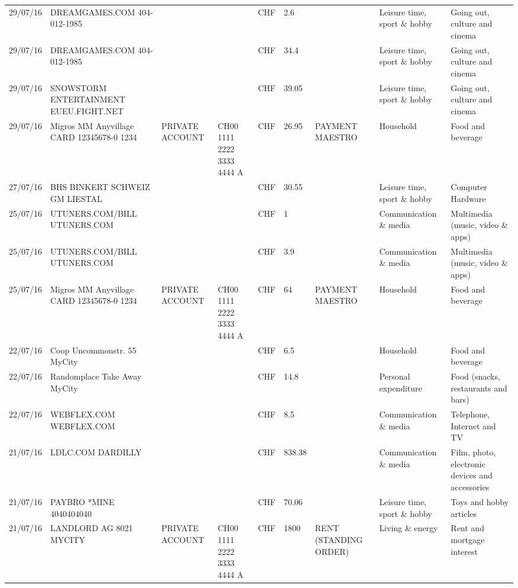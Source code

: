 \begin{landscape}
\begin{adjustwidth}{-2cm}{-2cm}
\begin{tiny}
\begin{longtable}{lp{4cm}llllp{3cm}ll}
		29/07/16 & DREAMGAMES.COM           404-012-1985 &       &       & CHF   & 2.6   &       & Leisure time, sport \& hobby & Going out, culture and cinema \\
		29/07/16 & DREAMGAMES.COM           404-012-1985 &       &       & CHF   & 34.4  &       & Leisure time, sport \& hobby & Going out, culture and cinema \\
		29/07/16 & SNOWSTORM ENTERTAINMENT EUEU.FIGHT.NET &       &       & CHF   & 39.05 &       & Leisure time, sport \& hobby & Going out, culture and cinema \\
		29/07/16 & Migros MM Anyvillage CARD 12345678-0 1234 & PRIVATE ACCOUNT & CH00 1111 2222 3333 4444 A & CHF   & 26.95 & PAYMENT MAESTRO & Household & Food and beverage \\
		27/07/16 & BHS BINKERT SCHWEIZ GM   LIESTAL &       &       & CHF   & 30.55 &       & Leisure time, sport \& hobby & Computer Hardware \\
		25/07/16 & UTUNERS.COM/BILL          UTUNERS.COM &       &       & CHF   & 1     &       & Communication \& media & Multimedia (music, video \& apps) \\
		25/07/16 & UTUNERS.COM/BILL          UTUNERS.COM &       &       & CHF   & 3.9   &       & Communication \& media & Multimedia (music, video \& apps) \\
		25/07/16 & Migros MM Anyvillage CARD 12345678-0 1234 & PRIVATE ACCOUNT & CH00 1111 2222 3333 4444 A & CHF   & 64    & PAYMENT MAESTRO & Household & Food and beverage \\
		22/07/16 & Coop Uncommonstr. 55   MyCity &       &       & CHF   & 6.5   &       & Household & Food and beverage \\
		22/07/16 & Randomplace Take Away     MyCity &       &       & CHF   & 14.8  &       & Personal expenditure & Food (snacks, restaurants and bars) \\
		22/07/16 & WEBFLEX.COM              WEBFLEX.COM &       &       & CHF   & 8.5   &       & Communication \& media & Telephone,  Internet and TV \\
		21/07/16 & LDLC.COM                 DARDILLY &       &       & CHF   & 838.38 &       & Communication \& media & Film, photo, electronic devices and accessories \\
		21/07/16 & PAYBRO *MINE       4040404040 &       &       & CHF   & 70.06 &       & Leisure time, sport \& hobby & Toys and hobby articles \\
		21/07/16 & LANDLORD AG 8021 MYCITY & PRIVATE ACCOUNT & CH00 1111 2222 3333 4444 A & CHF   & 1800  & RENT (STANDING ORDER) & Living \& energy & Rent and mortgage interest \\

\end{longtable}
\end{tiny}
\end{adjustwidth}
\end{landscape}
